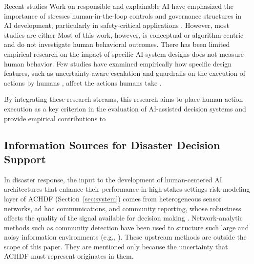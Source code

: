 \documentclass[journal]{IEEEtran}
\theoremstyle{plain}
\theoremstyle{definition}
\providecommand{\DIFaddtex}[1]{{\protect\color{blue} \sf #1}} %
\providecommand{\DIFdeltex}[1]{{\protect\color{red} \scriptsize #1}} %
\providecommand{\DIFaddbegin}{} %
\providecommand{\DIFaddend}{} %
\providecommand{\DIFdelbegin}{} %
\providecommand{\DIFdelend}{} %
\providecommand{\DIFadd}[1]{\texorpdfstring{\DIFaddtex{#1}}{#1}} %
\providecommand{\DIFdel}[1]{\texorpdfstring{\DIFdeltex{#1}}{}} %
\newcommand{\DIFscaledelfig}{0.5}
\newlength{\DIFdelgraphicswidth} %
\newlength{\DIFdelgraphicsheight} %
\newcommand{\DIFaddincludegraphics}[2][]{{\color{blue}\fbox{\DIFOincludegraphics[#1]{#2}}}} %
\newcommand{\DIFdelincludegraphics}[2][]{%
\sbox{\DIFdelgraphicsbox}{\DIFOincludegraphics[#1]{#2}}%
\settoboxwidth{\DIFdelgraphicswidth}{\DIFdelgraphicsbox} %
\settoboxtotalheight{\DIFdelgraphicsheight}{\DIFdelgraphicsbox} %
\scalebox{\DIFscaledelfig}{%
\parbox[b]{\DIFdelgraphicswidth}{\usebox{\DIFdelgraphicsbox}\\[-\baselineskip] \rule{\DIFdelgraphicswidth}{0em}}\llap{\resizebox{\DIFdelgraphicswidth}{\DIFdelgraphicsheight}{%
\setlength{\unitlength}{\DIFdelgraphicswidth}%
\begin{picture}(1,1)%
\thicklines\linethickness{2pt} %
{\color[rgb]{1,0,0}\put(0,0){\framebox(1,1){}}}%
{\color[rgb]{1,0,0}\put(0,0){\line( 1,1){1}}}%
{\color[rgb]{1,0,0}\put(0,1){\line(1,-1){1}}}%
\end{picture}%
}\hspace*{3pt}}} %
} %
\DeclareRobustCommand{\DIFaddbegin}{\DIFOaddbegin \let\includegraphics\DIFaddincludegraphics} %
\DeclareRobustCommand{\DIFaddend}{\DIFOaddend \let\includegraphics\DIFOincludegraphics} %
\DeclareRobustCommand{\DIFdelbegin}{\DIFOdelbegin \let\includegraphics\DIFdelincludegraphics} %
\DeclareRobustCommand{\DIFdelend}{\DIFOaddend \let\includegraphics\DIFOincludegraphics} %
\begin{document}
\DIFdelbegin \DIFdel{Recent studies }\DIFdelend \DIFaddbegin \DIFadd{Work }\DIFaddend on responsible and explainable AI \DIFdelbegin \DIFdel{have emphasized the importance of }\DIFdelend \DIFaddbegin \DIFadd{stresses }\DIFaddend human-in-the-loop controls and governance\DIFdelbegin \DIFdel{structures in AI development}\DIFdelend , particularly in safety-critical applications \cite{Weidinger2022FAccT,Assaad2023TAS,Miller2019XRDS,PerezCerrolaza2024CSUR}. \DIFdelbegin \DIFdel{However, most studies are either }\DIFdelend \DIFaddbegin \DIFadd{Most of this work, however, is }\DIFaddend conceptual or algorithm-centric and \DIFdelbegin \DIFdel{do not investigate human behavioral outcomes. There has been limited empirical research on the impact of specific AI system designs }\DIFdelend \DIFaddbegin \DIFadd{does not measure human behavior. Few studies have examined empirically how specific design features, }\DIFaddend such as uncertainty-aware escalation and guardrails\DIFdelbegin \DIFdel{on the execution of actions by humans }\DIFdelend \DIFaddbegin \DIFadd{, affect the actions humans take }\DIFaddend \cite{Bach2024Access,Lai2023FAccT}.

\DIFdelbegin \DIFdel{By integrating these research streams, this research aims to place human action execution as a key criterion in the evaluation of AI-assisted decision systems and provide empirical contributions to }\DIFdelend \DIFaddbegin \subsection{\DIFadd{Information Sources for Disaster Decision Support}}
\DIFadd{In disaster response, the input to }\DIFaddend the \DIFdelbegin \DIFdel{development of human-centered AI architectures that enhance their performance in high-stakes settings \cite{Yang2022THMSReview,Bach2024Access}}\DIFdelend \DIFaddbegin \DIFadd{risk-modeling layer of ACHDF (Section~\ref{sec:system}) comes from heterogeneous sensor networks, ad hoc communications, and community reporting, whose robustness affects the quality of the signal available for decision making \cite{Yang2005MobiHoc,Longo2025PMC,Stephens2022SIGDOC}. Network-analytic methods such as community detection have been used to structure such large and noisy information environments (e.g., \cite{Wakita2007WWW,Havens2013TFUZZ}). These upstream methods are outside the scope of this paper. They are mentioned only because the uncertainty that ACHDF must represent originates in them}\DIFaddend .


\end{document}
